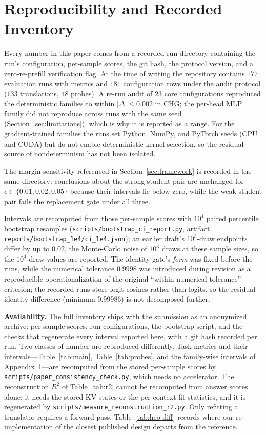 \documentclass{article} %
\newcommand{\kv}{\ensuremath{\mathrm{KV}}}
\begin{document}
\section{Reproducibility and Recorded Inventory}
\label{app:repro}

Every number in this paper comes from a recorded run directory containing the
run's configuration, per-sample scores, the git hash, the protocol version, and
a zero-re-prefill verification flag. At the time of writing the repository
contains $177$ evaluation runs with metrics and $181$ configuration rows under
the audit protocol ($133$ translations, $48$ probes). A re-run audit of $23$
core configurations reproduced the deterministic families to within $|\Delta|
\le 0.002$ in CHG; the per-head MLP family did not reproduce across runs with
the same seed (Section~\ref{sec:limitations}), which is why it is reported as a
range. For the gradient-trained families the runs set Python, NumPy, and PyTorch
seeds (CPU and CUDA) but do not enable deterministic kernel selection, so the
residual source of nondeterminism has not been isolated.

The margin sensitivity referenced in Section~\ref{sec:framework} is recorded in
the same directory: conclusions about the strong-student pair are unchanged for
$\epsilon\in\{0.01,0.02,0.05\}$ because their intervals lie below zero, while
the weak-student pair fails the replacement gate under all three.

Intervals are recomputed from those per-sample scores with $10^4$ paired
percentile bootstrap resamples (\texttt{scripts/bootstrap\_ci\_report.py},
artifact \texttt{reports/bootstrap\_1e4/ci\_1e4.json}); an earlier draft's
$10^3$-draw endpoints differ by up to $0.02$, the Monte-Carlo noise of $10^3$
draws at these sample sizes, so the $10^4$-draw values are reported.
The identity gate's \emph{form} was fixed before the runs, while the numerical
tolerance $0.9998$ was introduced during revision as a reproducible
operationalization of the original ``within numerical tolerance'' criterion;
the recorded runs store logit cosines rather than logits, so the residual
identity difference (minimum $0.99986$) is not decomposed further.

\textbf{Availability.} The full inventory ships with the submission as an
anonymized archive: per-sample scores, run configurations, the bootstrap script,
and the checks that regenerate every interval reported here, with a git hash
recorded per run. Two classes of number are reproduced differently. Task metrics
and their intervals---Table~\ref{tab:main}, Table~\ref{tab:probes}, and the
family-wise intervals of Appendix~\ref{app:repro}---are recomputed from the
stored per-sample scores by \texttt{scripts/paper\_consistency\_check.py}, which
needs no accelerator. The reconstruction $R^2$ of Table~\ref{tab:r2} cannot be
recomputed from answer scores alone: it needs the stored \kv{} states or the
per-context fit statistics, and it is regenerated by
\texttt{scripts/measure\_reconstruction\_r2.py}. Only refitting a translator
requires a forward pass. Table~\ref{tab:heo-diff} records where our
re-implementation of the closest published design departs from the reference.
\end{document}
